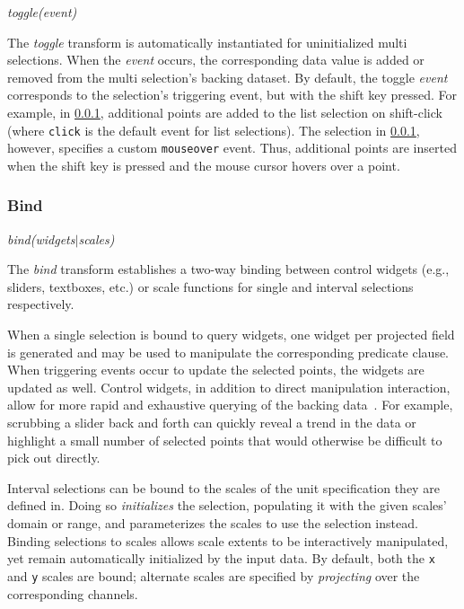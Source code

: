 \centerline{\emph{toggle(event)}}

The \emph{toggle} transform is automatically instantiated for uninitialized
multi selections. When the \emph{event} occurs, the corresponding data value is
added or removed from the multi selection's backing dataset. By default, the
toggle \emph{event} corresponds to the selection's triggering event, but with
the shift key pressed. For example, in \cref{}, additional
points are added to the list selection on shift-click (where \texttt{click} is
the default event for list selections). The selection in
\cref{}, however, specifies a custom \texttt{mouseover} event.
Thus, additional points are inserted when the shift key is pressed and the mouse
cursor hovers over a point.

\subsubsection{Bind}

\centerline{\emph{bind(widgets$|$scales)}}

The \emph{bind} transform establishes a two-way binding between control widgets
(e.g., sliders, textboxes, etc.) or scale functions for single and interval
selections respectively.

When a single selection is bound to query widgets, one widget per projected
field is generated and may be used to manipulate the corresponding predicate
clause. When triggering events occur to update the selected points, the widgets
are updated as well. Control widgets, in addition to direct manipulation
interaction, allow for more rapid and exhaustive querying of the backing
data~\cite{shneiderman:dynamicqueries}. For example, scrubbing a slider back and
forth can quickly reveal a trend in the data or highlight a small number of
selected points that would otherwise be difficult to pick out directly.

Interval selections can be bound to the scales of the unit specification they
are defined in. Doing so \emph{initializes} the selection, populating it with
the given scales' domain or range, and parameterizes the scales to use the
selection instead. Binding selections to scales allows scale extents to be
interactively manipulated, yet remain automatically initialized by the input
data. By default, both the \texttt{x} and \texttt{y} scales are bound; alternate
scales are specified by \emph{projecting} over the corresponding channels.


